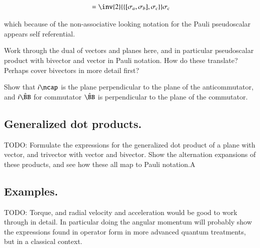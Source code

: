 \documentclass{article}
\newcommand{\symmetric}[2]{{\{{#1},{#2}\}}}
\newcommand{\antisymmetric}[2]{[{#1},{#2}]}
\newcommand{\Bcap}[0]{\hat{\BB}}
\begin{document}
\begin{align*}
\antisymmetric{\sigma_a}{\sigma_b} 
&= \inv{2} \symmetric{\antisymmetric{\sigma_a}{\sigma_b}}{\sigma_c} \sigma_c \\
\end{align*}

which because of the non-associative looking notation for the Pauli pseudoscalar appears self referential.

Work through the dual of vectors and planes here, and in particular 
pseudoscalar product with bivector and vector in Pauli notation.  How do these
translate?  Perhaps cover bivectors in more detail first?

Show that $i \ncap$ is the plane perpendicular to the plane of the anticommutator, and $i \Bcap$ for commutator $\Bcap$ is perpendicular to the plane of the commutator.

\subsection{ Generalized dot products. }

TODO: Formulate the expressions for the generalized dot product of a plane with vector, and trivector with vector and bivector.  Show the alternation expansions of these products, and see how these all map to Pauli notation.A

\subsection{ Examples. }

TODO: Torque, and radial velocity and acceleration would be good to work through in detail.  In particular doing the
angular momentum will probably show the expressions found in operator form in more advanced quantum treatments, but
in a classical context.



\end{document}
